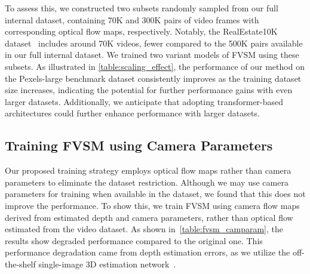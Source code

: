 To assess this, we constructed two subsets randomly sampled from our full internal dataset, containing 70K and 300K pairs of video frames with corresponding optical flow maps, respectively. 
Notably, the RealEstate10K dataset~\cite{zhou2018stereo} includes around 70K videos, fewer compared to the 500K pairs available in our full internal dataset.
We trained two variant models of FVSM using these subsets. 
As illustrated in \cref{table:scaling_effect}, the performance of our method on the Pexels-large benchmark dataset consistently improves as the training dataset size increases, indicating the potential for further performance gains with even larger datasets. Additionally, we anticipate that adopting transformer-based architectures could further enhance performance with larger datasets.


\begin{table}[!t]
\centering
{}
\vspace{-3mm}
\caption{
Analysis of training FVSM using camera parameters.
}
\vspace{-2mm}
\label{table:fvsm_camparam}
\end{table}


\subsection{Training FVSM using Camera Parameters}
Our proposed training strategy employs optical flow maps rather than camera parameters to eliminate the dataset restriction.
Although we may use camera parameters for training when available in the dataset, we found that this does not improve the performance.
To show this, we train FVSM using camera flow maps derived from estimated depth and camera parameters, rather than optical flow estimated from the video dataset.
As shown in~\cref{table:fvsm_camparam}, the results show degraded performance compared to the original one.
This performance degradation came from depth estimation errors, as we utilize the off-the-shelf single-image 3D estimation network~\cite{yang2024depth}.



